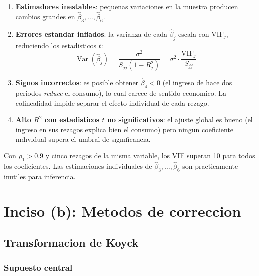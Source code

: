 \documentclass[12pt, letterpaper]{article}
\theoremstyle{remark}
\newcommand{\Var}{\operatorname{Var}}
\begin{document}
\begin{enumerate}[leftmargin=1.8em, itemsep=4pt]
  \item \textbf{Estimadores inestables}: pequenas variaciones en la muestra
    producen cambios grandes en $\hat\beta_3, \ldots, \hat\beta_6$.

  \item \textbf{Errores estandar inflados}: la varianza de cada $\hat\beta_j$
    escala con $\text{VIF}_j$, reduciendo los estadisticos $t$:
    \begin{equation}
      \Var(\hat\beta_j) = \frac{\sigma^2}{S_{jj}(1 - R_j^2)} = \sigma^2 \cdot
      \frac{\text{VIF}_j}{S_{jj}}
      \label{eq:var_vif}
    \end{equation}

  \item \textbf{Signos incorrectos}: es posible obtener $\hat\beta_4 < 0$
    (el ingreso de hace dos periodos \emph{reduce} el consumo), lo cual carece
    de sentido economico. La colinealidad impide separar el efecto individual
    de cada rezago.

  \item \textbf{Alto $R^2$ con estadisticos $t$ no significativos}: el ajuste
    global es bueno (el ingreso en sus rezagos explica bien el consumo) pero
    ningun coeficiente individual supera el umbral de significancia.
\end{enumerate}

\begin{clave}
  Con $\rho_1 > 0.9$ y cinco rezagos de la misma variable, los VIF superan
  10 para todos los coeficientes. Las estimaciones individuales de
  $\hat\beta_3, \ldots, \hat\beta_6$ son practicamente inutiles para inferencia.
\end{clave}

\section{Inciso (b): Metodos de correccion}

\subsection{Transformacion de Koyck}

\subsubsection{Supuesto central}
\end{document}
